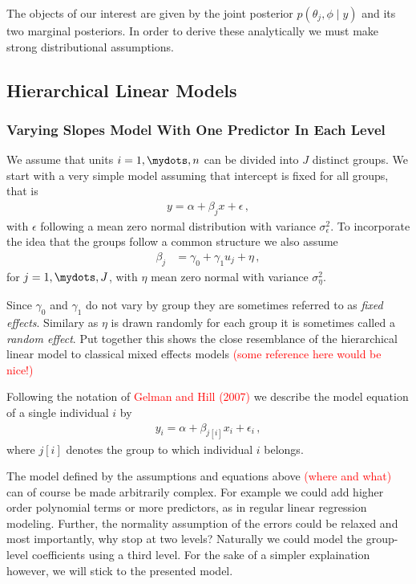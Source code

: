 The objects of our interest are given by the joint posterior $p(\theta_j, \phi \mid y)$
and its two marginal posteriors. In order to derive these analytically we must
make strong distributional assumptions.

\subsection{Hierarchical Linear Models}

\subsubsection{Varying Slopes Model With One Predictor In Each Level}
We assume that units $i = 1,\mydots,n$ can be divided into $J$ distinct groups.
We start with a very simple model assuming that intercept is fixed for all
groups, that is
\begin{align}
  y = \alpha + \beta_j x + \epsilon \,,
\end{align}
with $\epsilon$ following a mean zero normal distribution with variance
$\sigma_{\epsilon}^2$.
To incorporate the idea that the groups follow a common structure we also
assume
\begin{align}
  \beta_j &= \gamma_0 + \gamma_1 u_j + \eta \,,
\end{align}
for $j = 1,\mydots,J$, with $\eta$ mean zero normal with variance $\sigma_\eta^2$.

Since $\gamma_0$ and $\gamma_1$ do not vary by group they are sometimes referred
to as \emph{fixed effects}. Similary as $\eta$ is drawn randomly for each group
it is sometimes called a \emph{random effect}. Put together this shows the close
resemblance of the hierarchical linear model to classical mixed effects models
\textcolor{red}{(some reference here would be nice!)}

Following the notation of \textcolor{red}{Gelman and Hill (2007)} we describe the
model equation of a single individual $i$ by
\begin{align}
  y_i = \alpha + \beta_{j[i]} x_i + \epsilon_i \,,
\end{align}
where $j[i]$ denotes the group to which individual $i$ belongs.

The model defined by the assumptions and equations above \textcolor{red}{(where and what)} can of course be made
arbitrarily complex. For example we could add higher order polynomial terms or
more predictors, as in regular linear regression modeling. Further, the
normality assumption of the errors could be relaxed and most importantly, why
stop at two levels? Naturally we could model the group-level coefficients using
a third level. For the sake of a simpler explaination however, we will stick to
the presented model.

